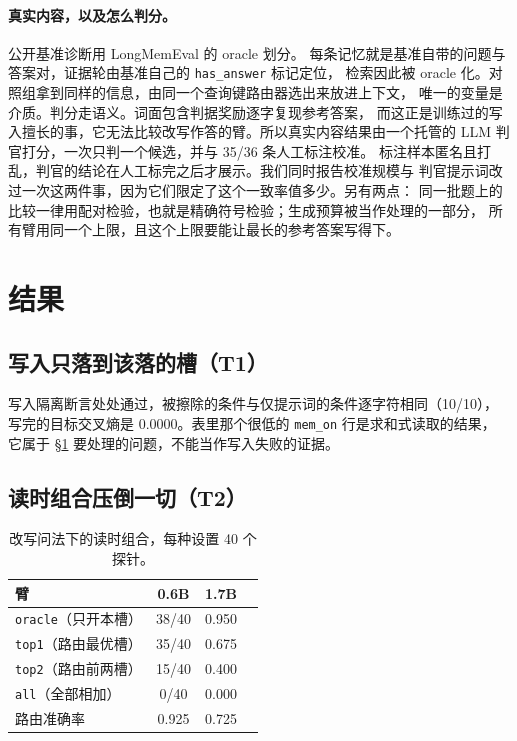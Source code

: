 \documentclass[11pt]{ctexart}
\begin{document}
\paragraph{真实内容，以及怎么判分。}公开基准诊断用 LongMemEval 的 oracle 划分。
每条记忆就是基准自带的问题与答案对，证据轮由基准自己的 \texttt{has\_answer} 标记定位，
检索因此被 oracle 化。对照组拿到同样的信息，由同一个查询键路由器选出来放进上下文，
唯一的变量是介质。判分走语义。词面包含判据奖励逐字复现参考答案，
而这正是训练过的写入擅长的事，它无法比较改写作答的臂。所以真实内容结果由一个托管的
LLM 判官打分，一次只判一个候选，并与 35/36 条人工标注校准。
标注样本匿名且打乱，判官的结论在人工标完之后才展示。我们同时报告校准规模与
判官提示词改过一次这两件事，因为它们限定了这个一致率值多少。另有两点：
同一批题上的比较一律用配对检验，也就是精确符号检验；生成预算被当作处理的一部分，
所有臂用同一个上限，且这个上限要能让最长的参考答案写得下。

\section{结果}
\label{sec:results}

\subsection{写入只落到该落的槽（T1）}
写入隔离断言处处通过，被擦除的条件与仅提示词的条件逐字符相同（10/10），
写完的目标交叉熵是 0.0000。表里那个很低的 \texttt{mem\_on} 行是求和式读取的结果，
它属于 §\ref{sec:results} 要处理的问题，不能当作写入失败的证据。

\subsection{读时组合压倒一切（T2）}
\begin{table}[h]\centering\small
\begin{tabular}{lccc}\toprule
臂 & 0.6B & \textbf{1.7B} \\ \midrule
\texttt{oracle}（只开本槽） & 38/40 & 0.950 \\
\texttt{top1}（路由最优槽） & 35/40 & 0.675 \\
\texttt{top2}（路由前两槽） & 15/40 & 0.400 \\
\texttt{all}（全部相加） & 0/40 & 0.000 \\
路由准确率 & 0.925 & 0.725 \\ \bottomrule
\end{tabular}
\caption{改写问法下的读时组合，每种设置 40 个探针。}
\end{table}
\end{document}
